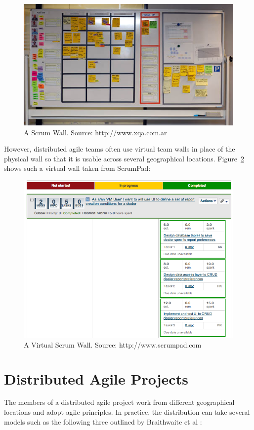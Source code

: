 \begin{figure}[bt]
	\centering
	\includegraphics[width=\textwidth]{ScrumWall.jpg}
    \caption{A Scrum Wall. Source: http://www.xqa.com.ar}
	\label{fig:scrum_wall}
\end{figure}

However, distributed agile teams often use virtual team walls in place of the physical wall so that it is usable across several geographical locations. Figure~\ref{fig:target_process_wall} shows such a virtual wall taken from ScrumPad:

\begin{figure}[bt]
	\centering
	\includegraphics[width=\textwidth]{ScrumPadWall.png}
    \caption{A Virtual Scrum Wall. Source: http://www.scrumpad.com}
	\label{fig:target_process_wall}
\end{figure}


\section{Distributed Agile Projects}
The members of a distributed agile project work from different geographical locations and adopt agile principles. In practice, the distribution can take several models such as the following three outlined by Braithwaite et al \cite{xp_expanded}:

